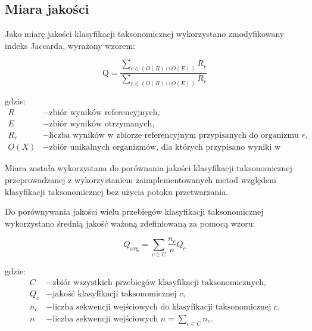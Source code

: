     \subsection{Miara jakości}

        Jako miarę jakości klasyfikacji taksonomicznej wykorzystano zmodyfikowany indeks Jaccarda, wyrażony wzorem:

        \begin{equation}
            \text{Q} = \frac{
                \sum_{r \in (O(R) \cap O(E))} R_{r}
            }{
                \sum_{r \in (O(R) \cup O(E))} R_{r}
            }
            \label{Equation:Quality}
        \end{equation}

        gdzie:
        \begin{align*}
            R &- \text{zbiór wyników referencyjnych,} \\
            E &- \text{zbiór wyników otrzymanych,} \\
            R_{r} &- \text{liczba wyników w zbiorze referencyjnym przypisanych do organizmu $r$,} \\
            O(X) &- \text{zbiór unikalnych organizmów, dla których przypisano wyniki w zbiorze X. }
        \end{align*}

        Miara została wykorzystana do porównania jakości klasyfikacji taksonomicznej przeprowadzanej z wykorzystaniem zaimplementowanych metod względem klasyfikacji taksonomicznej bez użycia potoku przetwarzania.

        Do porównywania jakości wielu przebiegów klasyfikacji taksonomicznej wykorzystano średnią jakość ważoną zdefiniowaną za pomocą wzoru:

        \begin{equation}
            Q_{\text{avg}} = \sum_{c \in C} \frac{n_c}{n} Q_c
            \label{Equation:WeightedAverageQuality}
        \end{equation}

        gdzie:
        \begin{align*}
          C &- \text{zbiór wszystkich przebiegów klasyfikacji taksonomicznych,} \\
          Q_c &- \text{jakość klasyfikacji taksonomicznej $c$,} \\
          n_c &- \text{liczba sekwencji wejściowych do klasyfikacji taksonomicznej $c$,}\\
          n   &- \text{liczba sekwencji wejściowych $n = \sum_{c \in C} n_{c}.$}
        \end{align*}

